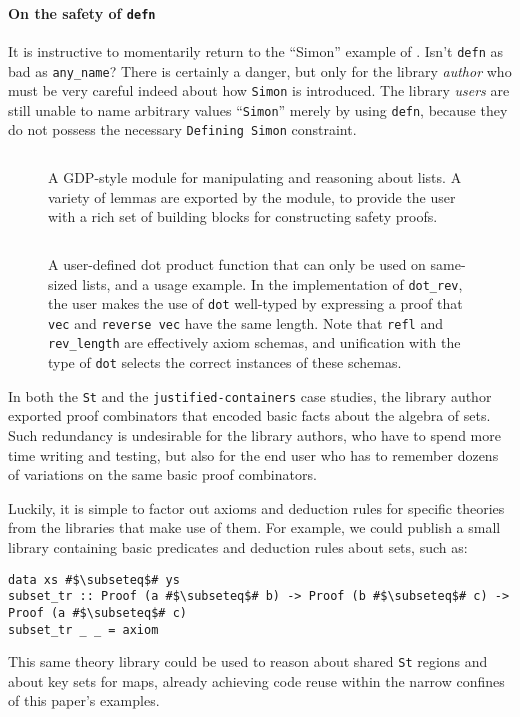 \documentclass[format=sigplan, review=false, screen=true, 10pt]{acmart}
\makeatletter
\let\origsubsection\subsection
\renewcommand\subsection{\@ifstar{\starsubsection}{\nostarsubsection}}
\newcommand\nostarsubsection[1]
{\subsectionprelude\origsubsection{#1}\subsectionpostlude}
\newcommand\starsubsection[1]
{\subsectionprelude\origsubsection*{#1}\subsectionpostlude}
\newcommand\subsectionprelude{%
  \vspace{-0.25em}
}
\newcommand\subsectionpostlude{%
  \vspace{-0.05em}
}
\makeatother
\begin{document}
\paragraph{On the safety of \texttt{defn}} It is instructive to momentarily return to the ``Simon'' example of . Isn't \texttt{defn}
as bad as \texttt{any\_name}? There is certainly a danger, but only for the library \emph{author}
who must be very careful indeed about how \texttt{Simon} is introduced. The library
\emph{users} are still unable to name arbitrary values ``\texttt{Simon}'' merely by using \texttt{defn}, because
they do not possess the necessary \texttt{Defining Simon} constraint.

\begin{figure}[t]
    \inputminted{haskell}{ex1.hs}
    \caption{A GDP-style module for manipulating and reasoning about lists.
      A variety of lemmas are exported by the module, to provide the
      user with a rich set of building blocks for constructing safety proofs.
       \label{lemma-demo}}
\end{figure}
\begin{figure}
    \inputminted{haskell}{ex2.hs}
    \caption{A user-defined dot product function that can only be used on same-sized lists,
      and a usage example. In the implementation of \texttt{dot\_rev}, the user makes the use
      of \texttt{dot} well-typed by expressing a proof that
      \texttt{vec} and \texttt{reverse vec} have the same length.
      Note that \texttt{refl} and \texttt{rev\_length} are effectively axiom schemas, and unification with
      the type of \texttt{dot} selects the correct instances of these schemas.\label{dot-product}}
\end{figure}

\subsection{Building Theory Libraries}
In both the \texttt{St} and the \texttt{justified-containers} case studies,
the library author exported proof combinators that encoded basic facts about
the algebra of sets. Such redundancy is undesirable for the library authors,
who have to spend more time writing and testing, but also for the end user who has to remember dozens of
variations on the same basic proof combinators.

Luckily, it is simple to factor out axioms and deduction rules for specific theories
from the libraries that make use of them. For example, we could publish a small
library containing basic predicates and deduction rules about sets, such as:
\begin{verbatim}
data xs #$\subseteq$# ys
subset_tr :: Proof (a #$\subseteq$# b) -> Proof (b #$\subseteq$# c) -> Proof (a #$\subseteq$# c)
subset_tr _ _ = axiom
\end{verbatim}
This same theory library could be used to reason about shared \texttt{St}
regions and about key sets for maps, already achieving code reuse within
the narrow confines of this paper's examples.
\end{document}
